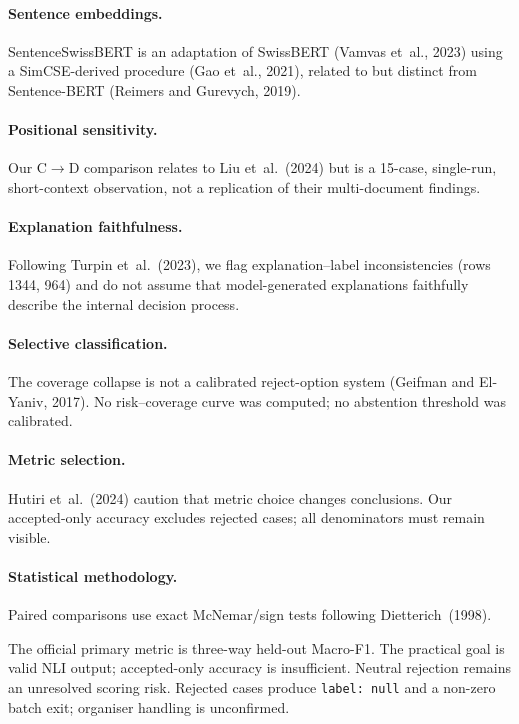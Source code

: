 \documentclass[10pt,a4paper]{article}
\begin{document}
\paragraph{Sentence embeddings.}
SentenceSwissBERT is an adaptation of SwissBERT (Vamvas et~al., 2023) using a SimCSE-derived procedure (Gao et~al., 2021), related to but distinct from Sentence-BERT (Reimers and Gurevych, 2019).

\paragraph{Positional sensitivity.}
Our C$\to$D comparison relates to Liu et~al.~(2024) but is a 15-case, single-run, short-context observation, not a replication of their multi-document findings.

\paragraph{Explanation faithfulness.}
Following Turpin et~al.~(2023), we flag explanation--label inconsistencies (rows 1344, 964) and do not assume that model-generated explanations faithfully describe the internal decision process.

\paragraph{Selective classification.}
The coverage collapse is not a calibrated reject-option system (Geifman and El-Yaniv, 2017). No risk--coverage curve was computed; no abstention threshold was calibrated.

\paragraph{Metric selection.}
Hutiri et~al.~(2024) caution that metric choice changes conclusions. Our accepted-only accuracy excludes rejected cases; all denominators must remain visible.

\paragraph{Statistical methodology.}
Paired comparisons use exact McNemar/sign tests following Dietterich~(1998).

The official primary metric is three-way held-out Macro-F1. The practical goal is valid NLI output; accepted-only accuracy is insufficient. Neutral rejection remains an unresolved scoring risk. Rejected cases produce \texttt{label: null} and a non-zero batch exit; organiser handling is unconfirmed.
\end{document}
